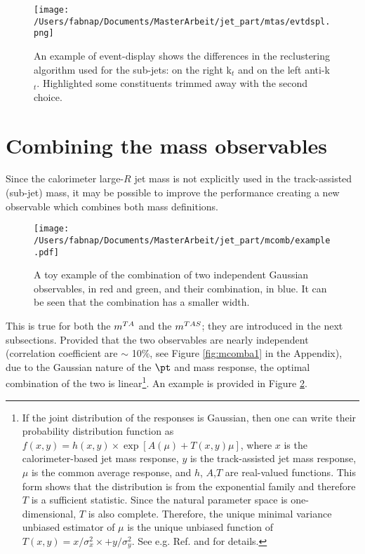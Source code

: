 \begin{figure}[!ht]
  \centering
      \texttt{[image: /Users/fabnap/Documents/MasterArbeit/jet\_part/mtas/evtdspl.png]}
  \caption[Different reclustering in event display]{An example of event-display shows the differences in the reclustering algorithm used for the sub-jets: on the right  k$_t$ and on the left anti-k$_t$. Highlighted some constituents trimmed away with the second choice.}
  \label{fig:evtdspl}
\end{figure}

\section{Combining the mass observables}


Since the calorimeter large-$R$ jet mass is not explicitly used in the track-assisted (sub-jet) mass, it may be possible to improve the performance creating a new observable which combines both mass definitions.


\begin{figure}[!ht]
  \centering
      \texttt{[image: /Users/fabnap/Documents/MasterArbeit/jet\_part/mcomb/example.pdf]}
  \caption[Toy example of Gaussian combination]{A toy example of the combination of two independent Gaussian observables, in red and green, and their combination, in blue. It can be seen that the combination has a smaller width.}
  \label{fig:mcomb1}
\end{figure}

This is true for both the $m^{TA}$ and the $m^{TAS}$; they are introduced in the next subsections.
Provided that the two observables are nearly independent (correlation coefficient are $\sim$ 10\%, see Figure \ref{fig:mcomba1} in the Appendix), due to the Gaussian nature of the $\pt$ and mass response, the optimal combination of the two is linear\footnote{If the joint distribution of the responses is Gaussian, then one can write their probability distribution function as $f(x,y)=h(x,y)\times \exp[A(\mu)+T(x,y)\mu]$, where $x$ is the calorimeter-based jet mass response, $y$ is the track-assisted jet mass response,
$\mu$ is the common average response, and $h$, $A$,$T$ are real-valued functions. This form shows that the distribution is from the exponential family and therefore $T$ is a sufficient statistic. Since the natural parameter space is one-dimensional, $T$ is also complete. Therefore, the unique minimal variance unbiased estimator of $\mu$ is the unique unbiased function of $T(x, y) =x/\sigma^2_x \times + y/\sigma^2_y$.
See e.g. Ref. \cite{statistic} and \cite{art35} for details.}.
An example is provided in Figure \ref{fig:mcomb1}.
